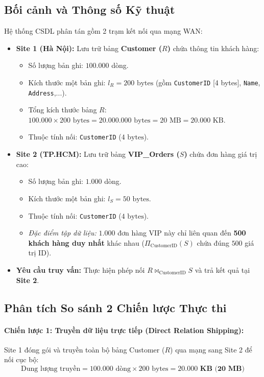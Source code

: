 \documentclass[12pt,a4paper]{report}
\begin{document}
\subsection{Bối cảnh và Thông số Kỹ thuật}
Hệ thống CSDL phân tán gồm 2 trạm kết nối qua mạng WAN:
\begin{itemize}[leftmargin=0.8cm, topsep=1pt, itemsep=1pt]
    \item \textbf{Site 1 (Hà Nội):} Lưu trữ bảng \textbf{Customer ($R$)} chứa thông tin khách hàng:
    \begin{itemize}
        \item Số lượng bản ghi: $100.000$ dòng.
        \item Kích thước một bản ghi: $l_R = 200\text{ bytes}$ (gồm \texttt{CustomerID} [4 bytes], \texttt{Name}, \texttt{Address},...).
        \item Tổng kích thước bảng $R$: $100.000 \times 200\text{ bytes} = 20.000.000\text{ bytes} = 20\text{ MB} = 20.000\text{ KB}$.
        \item Thuộc tính nối: \texttt{CustomerID} ($4\text{ bytes}$).
    \end{itemize}
    \item \textbf{Site 2 (TP.HCM):} Lưu trữ bảng \textbf{VIP\_Orders ($S$)} chứa đơn hàng giá trị cao:
    \begin{itemize}
        \item Số lượng bản ghi: $1.000$ dòng.
        \item Kích thước một bản ghi: $l_S = 50\text{ bytes}$.
        \item Thuộc tính nối: \texttt{CustomerID} ($4\text{ bytes}$).
        \item \textit{Đặc điểm tập dữ liệu:} $1.000$ đơn hàng VIP này chỉ liên quan đến \textbf{500 khách hàng duy nhất} khác nhau ($\Pi_{\text{CustomerID}}(S)$ chứa đúng $500$ giá trị ID).
    \end{itemize}
    \item \textbf{Yêu cầu truy vấn:} Thực hiện phép nối $R \bowtie_{\text{CustomerID}} S$ và trả kết quả tại \textbf{Site 2}.
\end{itemize}

\subsection{Phân tích So sánh 2 Chiến lược Thực thi}

\paragraph{Chiến lược 1: Truyền dữ liệu trực tiếp (Direct Relation Shipping):}
Site 1 đóng gói và truyền toàn bộ bảng Customer ($R$) qua mạng sang Site 2 để nối cục bộ:
\[
\text{Dung lượng truyền} = 100.000 \text{ dòng} \times 200 \text{ bytes} = \mathbf{20.000 \text{ KB (20 MB)}}
\]
\end{document}
